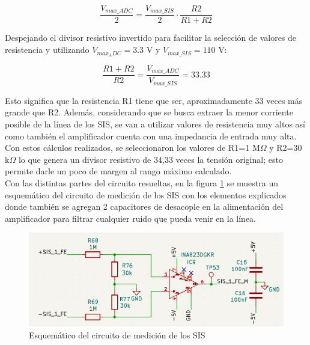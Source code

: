 \begin{equation}
    \frac{V_{max\_ADC}}{2} = \frac{V_{max\_SIS}}{2} \cdot \frac{R2}{R1 + R2}    
\end{equation}

Despejando el divisor resistivo invertido para facilitar la selección de valores de resistencia y utilizando $ V_{max_ADC}=3.3$ V y $V_{max\_SIS} = 110$ V: 

\begin{equation}
    \frac{R1 + R2}{R2}  = \frac{V_{max\_ADC}}{V_{max\_SIS}} = 33.33
\end{equation}

Esto significa que la resistencia R1 tiene que ser, aproximadamente 33 veces más grande que R2. Además, considerando que se busca extraer la menor corriente posible de la línea de los SIS, se van a utilizar valores de resistencia muy altos así como también el amplificador cuenta con una impedancia de entrada muy alta. Con estos cálculos realizados, se seleccionaron los valores de R1=1 M$\Omega$ y R2=30 k$\Omega$ lo que genera un divisor resistivo de 34,33 veces la tensión original; esto permite darle un poco de margen al rango máximo calculado. \\



Con las distintas partes del circuito resueltas, en la figura \ref{fig:sis_medicion} se muestra un esquemático del circuito de medición de los SIS con los elementos explicados donde también se agregan 2 capacitores de desacople en la alimentación del amplificador para filtrar cualquier ruido que pueda venir en la línea. 



\begin{figure}[H]
    \centering
    \includegraphics[width = \linewidth]{img/sis_medicion.png}
    \caption{Esquemático del circuito de medición de los SIS}
    \label{fig:sis_medicion}
\end{figure}


